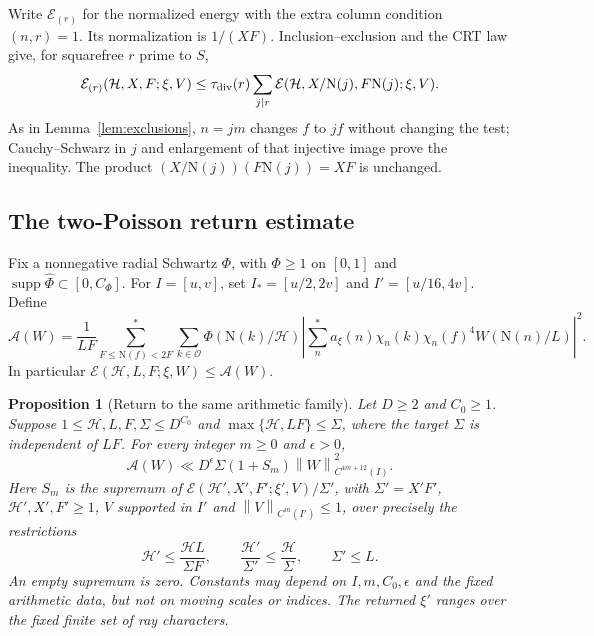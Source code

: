 \documentclass[11pt]{article}
\numberwithin{equation}{section}
\newtheorem{proposition}[theorem]{Proposition}
\theoremstyle{definition}
\theoremstyle{remark}
\newcommand{\OO}{\mathcal O}
\newcommand{\E}{\mathcal E}
\newcommand{\N}{\mathrm N}
\newcommand{\norm}[1]{\left\|#1\right\|}
\begin{document}
Write $\E_{(r)}$ for the normalized energy with the extra column condition
$(n,r)=1$. Its normalization is $1/(XF)$. Inclusion--exclusion and the CRT
law give, for squarefree $r$ prime to $S$,
\begin{equation}\label{eq:transfer-exclusions}
 \E_{(r)}(\mathcal H,X,F;\xi,V)
 \le\tau_{\rm div}(r)\sum_{j\mid r}
 \E(\mathcal H,X/\N(j),F\N(j);\xi,V).
\end{equation}
As in Lemma~\ref{lem:exclusions}, $n=jm$ changes $f$ to $jf$ without
changing the test; Cauchy--Schwarz in $j$ and enlargement of that injective
image prove the inequality. The product $(X/\N(j))(F\N(j))=XF$ is unchanged.

\subsection{The two-Poisson return estimate}
Fix a nonnegative radial Schwartz $\Phi$, with $\Phi\ge1$ on $[0,1]$ and
$\operatorname{supp}\widehat\Phi\subset[0,C_\Phi]$. For $I=[u,v]$, set
$I_*=[u/2,2v]$ and $I'=[u/16,4v]$. Define
\[
 \mathcal A(W)=\frac1{LF}\sum_{F\le\N(f)<2F}^*
 \sum_{k\in\OO}\Phi(\N(k)/\mathcal H)
 \left|\sum_n^*a_\xi(n)\chi_n(k)\chi_n(f)^4W(\N(n)/L)\right|^2.
\]
In particular $\E(\mathcal H,L,F;\xi,W)\le\mathcal A(W)$.

\begin{proposition}[Return to the same arithmetic family]
\label{prop:consolidated-transfer}
Let $D\ge2$ and $C_0\ge1$. Suppose $1\le\mathcal H,L,F,\Sigma\le D^{C_0}$ and
$\max\{\mathcal H,LF\}\le\Sigma$, where the target $\Sigma$ is independent
of $LF$. For every integer $m\ge0$ and $\epsilon>0$,
\[
 \mathcal A(W)\ll D^\epsilon\Sigma
       (1+S_m)\norm{W}_{C^{4m+12}(I)}^2.
\]
Here $S_m$ is the supremum of
$\E(\mathcal H',X',F';\xi',V)/\Sigma'$, with $\Sigma'=X'F'$,
$\mathcal H',X',F'\ge1$, $V$ supported in $I'$ and
$\norm{V}_{C^m(I')}\le1$, over precisely the restrictions
\begin{equation}\label{eq:consolidated-child}
 \mathcal H'\le\frac{\mathcal HL}{\Sigma F},\qquad
 \frac{\mathcal H'}{\Sigma'}\le\frac{\mathcal H}{\Sigma},\qquad
 \Sigma'\le L.
\end{equation}
An empty supremum is zero. Constants may depend on $I,m,C_0,\epsilon$
and the fixed arithmetic data, but not on moving scales or indices.
The returned $\xi'$ ranges over the fixed finite set of ray characters.
\end{proposition}
\end{document}
